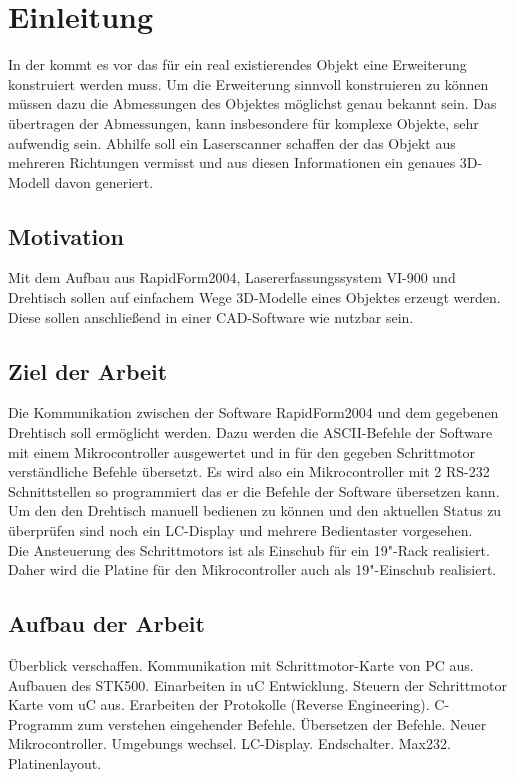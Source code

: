 \chapter{Einleitung}
\label{cha:Einleitung}

In der   kommt es vor das für ein real existierendes Objekt eine Erweiterung konstruiert werden muss. Um die Erweiterung sinnvoll konstruieren zu können müssen dazu die Abmessungen des Objektes möglichst genau bekannt sein. Das übertragen der Abmessungen, kann insbesondere für komplexe Objekte, sehr aufwendig sein.
Abhilfe soll ein Laserscanner schaffen der das Objekt aus mehreren Richtungen vermisst und aus diesen Informationen ein genaues 3D-Modell davon generiert. 

\section{Motivation}
\label{sec:Motivation}
Mit dem Aufbau aus RapidForm2004, Lasererfassungssystem VI-900 und Drehtisch sollen auf einfachem Wege 3D-Modelle eines Objektes erzeugt werden. Diese sollen anschließend in einer CAD-Software wie  nutzbar sein.\\

\section{Ziel der Arbeit}
\label{sec:ZielDerArbeit}
Die Kommunikation zwischen der Software RapidForm2004 und dem gegebenen Drehtisch soll ermöglicht werden. Dazu werden die ASCII-Befehle der Software mit einem Mikrocontroller ausgewertet und in für den gegeben Schrittmotor verständliche Befehle übersetzt.
Es wird also ein Mikrocontroller mit 2 RS-232 Schnittstellen so programmiert das er die Befehle der Software übersetzen kann. Um den den Drehtisch manuell bedienen zu können und den aktuellen Status zu überprüfen sind noch ein LC-Display und mehrere Bedientaster vorgesehen.\\
Die Ansteuerung des Schrittmotors ist als Einschub für ein 19"-Rack realisiert. Daher wird die Platine für den Mikrocontroller auch als 19"-Einschub realisiert.


\section{Aufbau der Arbeit}
\label{sec:AufbauDerArbeit}
 Überblick verschaffen. Kommunikation mit Schrittmotor-Karte von PC aus. Aufbauen des STK500. Einarbeiten in uC Entwicklung. Steuern der Schrittmotor Karte vom uC aus. Erarbeiten der Protokolle (Reverse Engineering). C-Programm zum verstehen eingehender Befehle. Übersetzen der Befehle. Neuer Mikrocontroller. Umgebungs wechsel. LC-Display. Endschalter. Max232. Platinenlayout.


